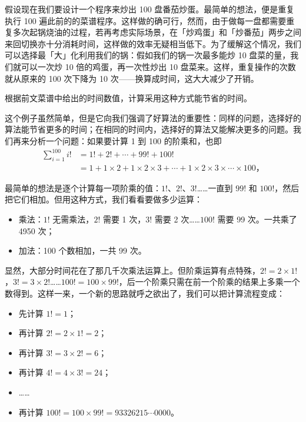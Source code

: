 假设现在我们要设计一个程序来炒出 100 盘番茄炒蛋。最简单的想法，便是重复执行 100 遍此前的的菜谱程序。这样做的确可行，然而，由于做每一盘都需要重复多次起锅烧油的过程，若再考虑实际场景，在「炒鸡蛋」和「炒番茄」两步之间来回切换亦十分消耗时间，这样做的效率无疑相当低下。为了缓解这个情况，我们可以选择最「大」化利用我们的锅：假如我们的锅一次最多能炒 10 盘菜的量，我们就可以一次炒 10 倍的鸡蛋，再一次性炒出 10 盘菜来。这样，重复操作的次数就从原来的 100 次下降为 10 次——换算成时间，这大大减少了开销。

\begin{note}
  根据前文菜谱中给出的时间数值，计算采用这种方式能节省的时间。
\end{note}

这个例子虽然简单，但是它向我们强调了好算法的重要性：同样的问题，选择好的算法能节省更多的时间；在相同的时间内，选择好的算法又能解决更多的问题。我们再来分析一个问题：如果要计算 1 到 100 的阶乘和，也即
\begin{align*}
  \sum_{i=1}^{100}i!&=1!+2!+\cdots+99!+100! \\
  &=1+1\times 2+1\times 2\times 3+\cdots+1\times 2\times 3\times\cdots\times 100\text{，}
\end{align*}

最简单的想法是逐个计算每一项阶乘的值：$1!$、$2!$、$3!$……一直到 $99!$ 和 $100!$，然后把它们相加。但用这种方式，我们看看要做多少运算：

\begin{itemize}
  \item 乘法：$1!$ 无需乘法，$2!$ 需要 1 次，$3!$ 需要 2 次……$100!$ 需要 99 次。一共乘了 4950 次；
  \item 加法：100 个数相加，一共 99 次。
\end{itemize}

显然，大部分时间花在了那几千次乘法运算上。但阶乘运算有点特殊，$2! = 2\times 1!$，$3! = 3\times 2!$……$100! = 100\times 99!$，后一个阶乘只需在前一个阶乘的结果上多乘一个数得到。这样一来，一个新的思路就呼之欲出了，我们可以把计算流程变成：

\begin{itemize}
  \item 先计算 $1! = 1$；
  \item 再计算 $2! = 2 \times 1! = 2$；
  \item 再计算 $3! = 3 \times 2! = 6$；
  \item 再计算 $4! = 4 \times 3! = 24$；
  \item ……
  \item 再计算 $100! = 100 \times 99! = 93326215 \cdots 0000$。
\end{itemize}

